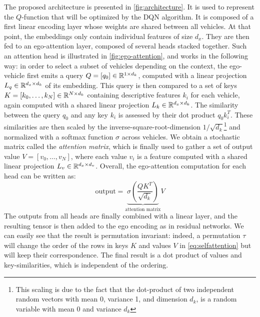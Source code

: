 \documentclass{article}
\begin{document}
{The proposed architecture is presented in \autoref{fig:architecture}. It is used to represent the $Q$-function that will be optimized by the DQN algorithm. It is composed of a first linear encoding layer whose weights are shared between all vehicles. At that point, the embeddings only contain individual features of size $d_x$. They are then fed to an ego-attention layer, composed of several heads stacked together. Such an attention head is illustrated in \autoref{fig:ego-attention}, and works in the following way: in order to select a subset of vehicles depending on the context, the ego-vehicle  first emits a query $Q = [q_0]\in\mathbb{R}^{1 \times d_k}$, computed with a linear projection $L_q\in\mathbb{R}^{d_x \times d_k}$ of its embedding. This query is then compared to a set of keys $K = [k_0, \dots, k_N]\in\mathbb{R}^{N \times d_k}$ containing descriptive features $k_i$ for each vehicle, again computed with a shared linear projection $L_k\in\mathbb{R}^{d_x \times d_k}$. The similarity between the query $q_0$ and any key $k_i$ is assessed by their dot product $q_0 k_i^T$. These similarities are then scaled by the inverse-square-root-dimension $1/\sqrt{d_k}$\footnote{This scaling is due to the fact that the dot-product of two independent random vectors with mean 0,  variance 1, and dimension $d_k$, is a random variable with mean 0 and variance $d_k$} and normalized with a softmax function $\sigma$ across vehicles. We obtain a stochastic matrix called the \emph{attention matrix}, which is finally used to gather a set of output value $V = [v_0, \dots, v_N]$, where each value $v_i$ is a feature computed with a shared linear projection $L_v\in\mathbb{R}^{d_x \times d_v}$. Overall, the ego-attention computation for each head can be written as:
\begin{equation}
\text{output}=\underbrace{\sigma\left(\frac{QK^T}{\sqrt{d_k}}\right)}_{\text{attention matrix}}V
\label{eq:selfattention}
\end{equation}
The outputs from all heads are finally combined with a linear layer, and the resulting tensor is then added to the ego encoding as in residual networks. We can easily see that the result is permutation invariant: indeed, a permutation $\tau$ will change the order of the rows in keys $K$ and values $V$ in \eqref{eq:selfattention} but will keep their correspondence. The final result is a dot product of values and key-similarities, which is independent of the ordering.


\begin{figure}[tp]
	\centering
\end{figure}}
\end{document}

